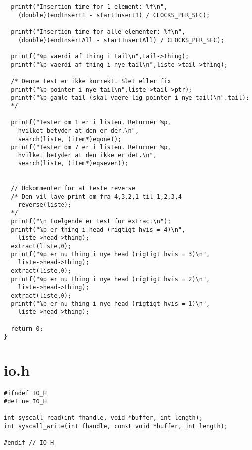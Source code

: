 \documentclass[a4paper,12pt]{article}
\begin{document}
\begin{lstlisting}
  printf("Insertion time for 1 element: %f\n",
    (double)(endInsert1 - startInsert1) / CLOCKS_PER_SEC);

  printf("Insertion time for alle elementer: %f\n",
    (double)(endInsertAll - startInsertAll) / CLOCKS_PER_SEC);

  printf("%p vaerdi af thing i tail\n",tail->thing);
  printf("%p vaerdi af thing i nye tail\n",liste->tail->thing);

  /* Denne test er ikke korrekt. Slet eller fix
  printf("%p pointer i nye tail\n",liste->tail->ptr);
  printf("%p gamle tail (skal vaere lig pointer i nye tail)\n",tail);
  */

  printf("Tester om 1 er i listen. Returner %p, 
    hvilket betyder at den er der.\n",
    search(liste, (item*)eqone));
  printf("Tester om 7 er i listen. Returner %p, 
    hvilket betyder at den ikke er det.\n",
    search(liste, (item*)eqseven));


  // Udkommenter for at teste reverse
  /* Den vil lave print om fra 4,3,2,1 til 1,2,3,4
    reverse(liste);
  */
  printf("\n Foelgende er test for extract\n");
  printf("%p er thing i head (rigtigt hvis = 4)\n",
    liste->head->thing);
  extract(liste,0);
  printf("%p er nu thing i nye head (rigtigt hvis = 3)\n",
    liste->head->thing);
  extract(liste,0);
  printf("%p er nu thing i nye head (rigtigt hvis = 2)\n",
    liste->head->thing);
  extract(liste,0);
  printf("%p er nu thing i nye head (rigtigt hvis = 1)\n",
    liste->head->thing);

  return 0;
}

\end{lstlisting}
\newpage

\section*{io.h}
\begin{lstlisting}
#ifndef IO_H
#define IO_H

int syscall_read(int fhandle, void *buffer, int length);
int syscall_write(int fhandle, const void *buffer, int length);

#endif // IO_H
\end{lstlisting}
\newpage
\end{document}

